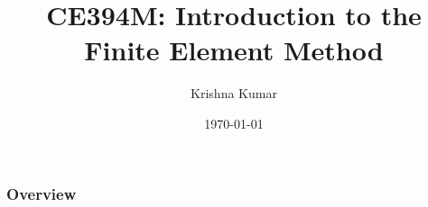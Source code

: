 \documentclass[handout]{beamer}
\title[CE394M: Intro to FEM]{CE394M: Introduction to the Finite Element Method}
\author{Krishna Kumar} %
\institute[UT Austin] %
{
University of Texas at Austin \\
\medskip
\textit{
  \url{krishnak@utexas.edu}} %
}
\date{\today} %
\begin{document}
\begin{frame}
\titlepage %
\end{frame}

\begin{frame}
 \frametitle{Overview}
 \tableofcontents
\end{frame}
\end{document}
